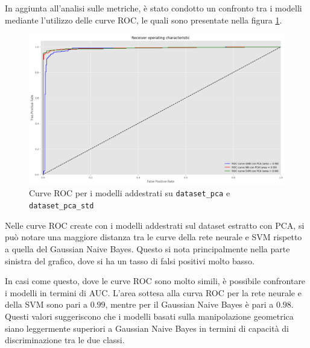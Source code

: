 In aggiunta all'analisi sulle metriche, è stato condotto un confronto tra i
modelli mediante l'utilizzo delle curve ROC, le quali sono presentate nella
figura \ref{fig:roc_curve_pca}.
\begin{figure}[!ht]
    \centering
    \includegraphics[width=\textwidth]{img/ris/roc_curve_pca.png}
    \caption{Curve ROC per i modelli addestrati su \texttt{dataset\_pca} e \texttt{dataset\_pca\_std}}
    \label{fig:roc_curve_pca}
\end{figure}

Nelle curve ROC create con i modelli addestrati sul dataset estratto con PCA, si
può notare una maggiore distanza tra le curve della rete neurale e SVM rispetto
a quella del Gaussian Naive Bayes. Questo si nota principalmente nella parte
sinistra del grafico, dove si ha un tasso di falsi positivi molto basso.

In casi come questo, dove le curve ROC sono molto simili, è possibile confrontare
i modelli in termini di AUC. L'area sottesa alla curva ROC per la rete neurale e
della SVM sono pari a $0.99$, mentre per il Gaussian Naive Bayes è pari a $0.98$.
Questi valori suggeriscono che i modelli basati sulla manipolazione geometrica
siano leggermente superiori a Gaussian Naive Bayes in termini di capacità di
discriminazione tra le due classi.

